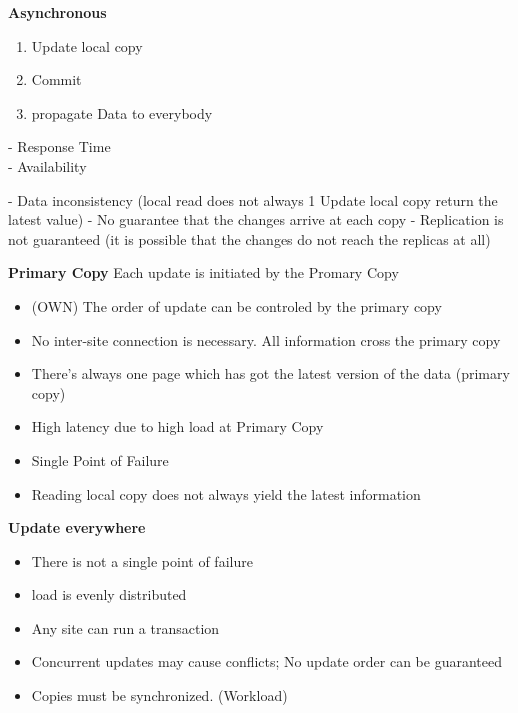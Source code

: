 \documentclass[a4paper,12pt]{article}%
\begin{document}
{\bf Asynchronous}
\begin{enumerate}
\item Update local copy
 \item Commit
 \item propagate Data  to everybody
\end{enumerate}
 {\color[HTML]{9AB299} - Response Time\\ - Availability}    
 
{\color[HTML]{A38C8C} 
 
- Data inconsistency
(local read does not always
1 Update local copy
return the latest value)
- No guarantee that the changes
arrive at each copy
- Replication is not guaranteed (it is possible that the changes do not reach the replicas at all)
}



{\bf Primary Copy}
  Each update is initiated by the Promary Copy


 {\color[HTML]{9AB299} 
 \begin{itemize}
  \item (OWN) The order of update can be controled by the primary copy
  \item No inter-site connection is necessary. All information cross the primary copy
  \item There's always one page which has got the latest version of the data (primary copy)
 \end{itemize}

 }   
{\color[HTML]{A38C8C}
 \begin{itemize}
  \item High latency due to high load at Primary Copy
  \item Single Point of Failure
  \item Reading local copy does not always yield the latest information
 \end{itemize}
 }

{\bf Update everywhere}

 {\color[HTML]{9AB299} 
 \begin{itemize}
  \item There is not a single point of failure
  \item load is evenly distributed
  \item Any site can run a transaction 
 \end{itemize}

 }   
{\color[HTML]{A38C8C}
 \begin{itemize}
  \item Concurrent updates may cause conflicts; No update order can be guaranteed
  \item Copies must be synchronized. (Workload)
 \end{itemize}
 }
 
\end{document}
